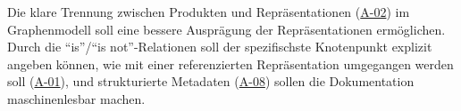Die klare Trennung zwischen Produkten und Repräsentationen (\hyperref[subsec:req-product-concept]{A-02}) im Graphenmodell soll eine bessere Ausprägung der Repräsentationen ermöglichen.
Durch die \enquote{is}/\enquote{is not}-Relationen soll der spezifischste Knotenpunkt explizit angeben können, wie mit einer referenzierten Repräsentation umgegangen werden soll (\hyperref[subsec:req-format-product-graph]{A-01}), und strukturierte Metadaten (\hyperref[subsec:req-reason-format]{A-08}) sollen die Dokumentation maschinenlesbar machen.
